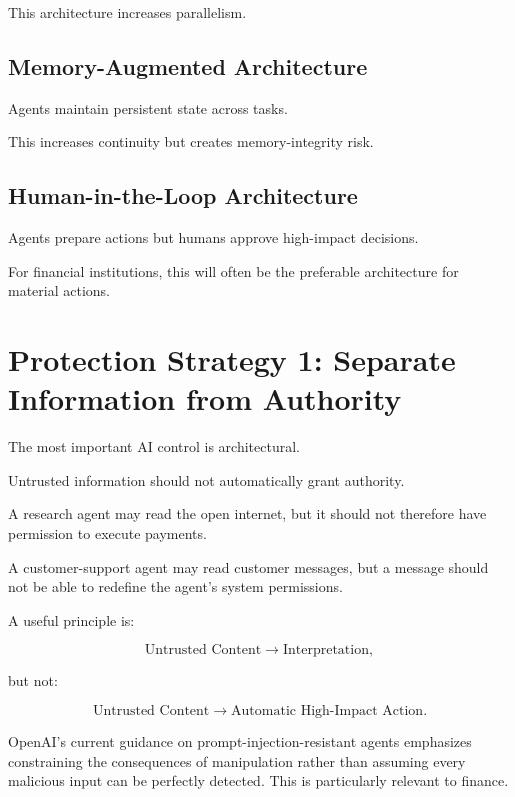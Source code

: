 This architecture increases parallelism.

\subsection{Memory-Augmented Architecture}

Agents maintain persistent state across tasks.

This increases continuity but creates memory-integrity risk.

\subsection{Human-in-the-Loop Architecture}

Agents prepare actions but humans approve high-impact decisions.

For financial institutions, this will often be the preferable architecture for material actions.

\section{Protection Strategy 1: Separate Information from Authority}

The most important AI control is architectural.

Untrusted information should not automatically grant authority.

A research agent may read the open internet, but it should not therefore have permission to execute payments.

A customer-support agent may read customer messages, but a message should not be able to redefine the agent's system permissions.

A useful principle is:

\begin{equation}
\text{Untrusted Content}
\rightarrow
\text{Interpretation},
\end{equation}

but not:

\begin{equation}
\text{Untrusted Content}
\rightarrow
\text{Automatic High-Impact Action}.
\end{equation}

OpenAI's current guidance on prompt-injection-resistant agents emphasizes constraining the consequences of manipulation rather than assuming every malicious input can be perfectly detected. This is particularly relevant to finance.

